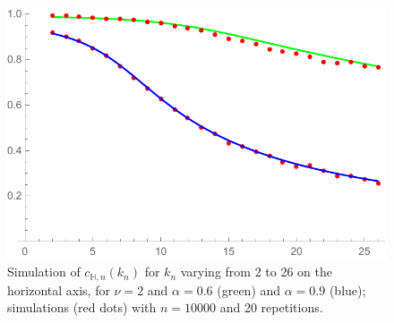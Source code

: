 \begin{figure}
    \centering
    \includegraphics[scale=0.6]{figures/sim1024ck225n10000a0609nu2rep20.pdf}
    \caption{Simulation of $c_{\mathbb{H},n}(k_n)$ for $k_n$ varying from 2 to 26 on the horizontal axis, for $\nu=2$ and $\alpha=0.6$ (green) and $\alpha=0.9$ (blue); simulations (red dots) with $n=10 000$ and 20 repetitions.}
    \label{fig:ckvariable}
\end{figure}